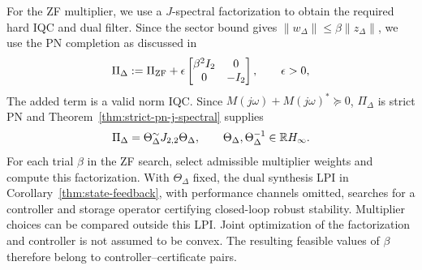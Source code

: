 For the ZF multiplier, we use a $J$-spectral factorization to obtain
the required hard IQC and dual filter. Since the sector bound gives
$\|w_\Delta\|\leq\beta\|z_\Delta\|$, we use the PN completion as discussed in \cite{6915700}
\begin{equation}\label{eq:stn-gpe-combined-multiplier}
\Pi_\Delta:=\Pi_{{\mathrm{ZF}}}+
\epsilon\begin{bmatrix}\beta^2I_2&0\\0&-I_2\end{bmatrix},\qquad\epsilon>0,
\end{equation}
The added term is a valid norm IQC. Since
$M(j\omega)+M(j\omega)^*\succeq0$, $\Pi_\Delta$ is strict PN and
Theorem~\ref{thm:strict-pn-j-spectral} supplies
\begin{equation*}
\Pi_\Delta=\Theta_\Delta^\sim J_{2,2}\Theta_\Delta,
\qquad
\Theta_\Delta,\Theta_\Delta^{-1}\in\mathbb{R} H_\infty.
\end{equation*}
For each trial $\beta$ in the ZF search, select admissible multiplier
weights and compute this factorization. With $\Theta_\Delta$ fixed, the dual synthesis LPI
in Corollary~\ref{thm:state-feedback}, with performance channels omitted,
searches for a controller and storage operator certifying closed-loop
robust stability. Multiplier choices can be compared outside this LPI.
Joint optimization of the factorization and controller is not assumed
to be convex. The resulting feasible values of $\beta$ therefore belong
to controller--certificate pairs.

